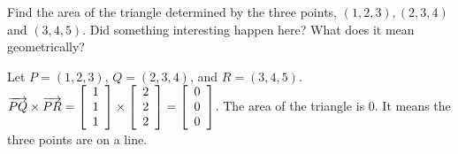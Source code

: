 \documentclass{ximera}
\begin{document}
  \begin{example}
    Find the area of the triangle determined by the three points,
    $(1,2,3),(2,3,4)$ and $(3,4,5)$. Did something
    interesting happen here? What does it mean geometrically?
    \begin{solution}
      Let $P=(1,2,3)$, $Q=(2,3,4)$, and $R=(3,4,5)$. 
      $\longvect{PQ}\times\longvect{PR}
      = \startmat{r}
        1 \\ 1 \\ 1
      \stopmat \times \startmat{r}
        2 \\ 2 \\ 2
      \stopmat = \startmat{r}
        0 \\ 0 \\ 0
      \stopmat$.
      The area of the triangle is 0. It means the three points are on
      a line.
    \end{solution}
  \end{example}
\end{document}
